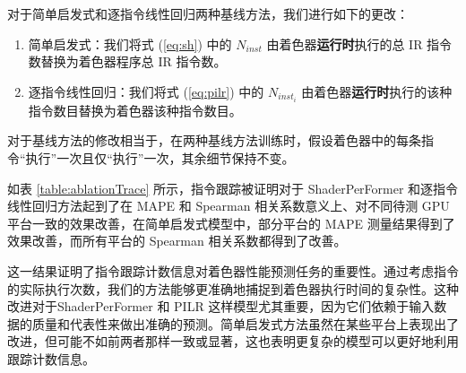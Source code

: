 对于简单启发式和逐指令线性回归两种基线方法，我们进行如下的更改：
\begin{enumerate}
    \item 简单启发式：我们将式 (\ref{eq:sh}) 中的 $N_{inst}$ 由着色器\textbf{运行时}执行的总 IR 指令数替换为着色器程序总 IR 指令数。
    \item 逐指令线性回归：我们将式 (\ref{eq:pilr}) 中的 $N_{inst_i}$ 由着色器\textbf{运行时}执行的该种指令数目替换为着色器该种指令数目。 
\end{enumerate}

对于基线方法的修改相当于，在两种基线方法训练时，假设着色器中的每条指令“执行”一次且仅“执行”一次，其余细节保持不变。

如表 \ref{table:ablationTrace} 所示，指令跟踪被证明对于 ShaderPerFormer 和逐指令线性回归方法起到了在 MAPE 和 Spearman 相关系数意义上、对不同待测 GPU 平台一致的效果改善，在简单启发式模型中，部分平台的 MAPE 测量结果得到了效果改善，而所有平台的 Spearman 相关系数都得到了改善。

这一结果证明了指令跟踪计数信息对着色器性能预测任务的重要性。通过考虑指令的实际执行次数，我们的方法能够更准确地捕捉到着色器执行时间的复杂性。这种改进对于ShaderPerFormer 和 PILR 这样模型尤其重要，因为它们依赖于输入数据的质量和代表性来做出准确的预测。简单启发式方法虽然在某些平台上表现出了改进，但可能不如前两者那样一致或显著，这也表明更复杂的模型可以更好地利用跟踪计数信息。

